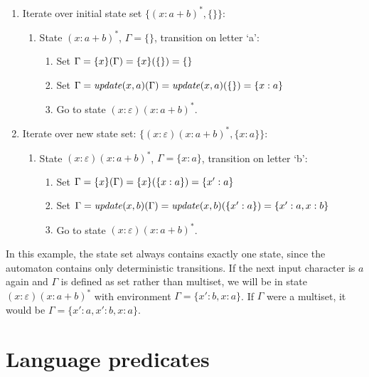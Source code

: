 \begin{eg}
   \begin{enumerate}
      \item Iterate over initial state set $\{(x:a+b)^*, \{\}\}$:
         \begin{enumerate}
            \item State $(x:a+b)^*$, $\Gamma = \{\}$, transition on letter `a':
            \begin{enumerate}
               \item Set $\Gamma = \iteratex(\Gamma) = \iteratex(\{\}) = \{\}$
               \item Set $\Gamma = \mathit{update}(x, a)(\Gamma) = \mathit{update}(x, a)(\{\}) = \{x:a\}$
               \item Go to state $(x:\varepsilon)(x:a+b)^*$.
            \end{enumerate}
         \end{enumerate}
      \item Iterate over new state set: $\{(x:\varepsilon)(x:a+b)^*, \{x:a\}\}$:
         \begin{enumerate}
            \item State $(x:\varepsilon)(x:a+b)^*$, $\Gamma = \{x:a\}$, transition on letter `b':
            \begin{enumerate}
               \item Set $\Gamma = \iteratex(\Gamma) = \iteratex(\{x:a\}) = \{x':a\}$
               \item Set $\Gamma = \mathit{update}(x, b)(\Gamma) = \mathit{update}(x, b)(\{x':a\}) = \{x':a, x:b\}$
               \item Go to state $(x:\varepsilon)(x:a+b)^*$.
            \end{enumerate}
         \end{enumerate}
   \end{enumerate}

   In this example, the state set always contains exactly one state, since the
   automaton contains only deterministic transitions. If the next input
   character is $a$ again and $\Gamma$ is defined as set rather than multiset,
   we will be in state $(x:\varepsilon)(x:a+b)^*$ with environment $\Gamma =
   \{x':b, x:a\}$. If $\Gamma$ were a multiset, it would be $\Gamma = \{x':a,
   x':b, x:a\}$.

\end{eg}


\section{Language predicates}

